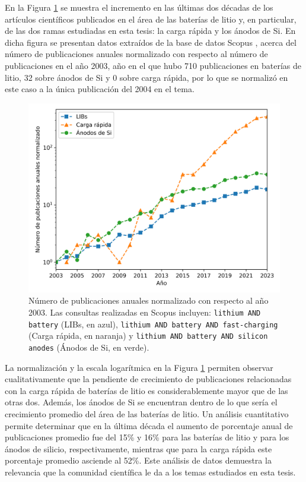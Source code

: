 En la Figura \ref{fig:scopus} se muestra el incremento en las últimas dos décadas
de los artículos científicos publicados en el área de las baterías de litio y, en 
particular, de las dos ramas estudiadas en esta tesis: la carga rápida y los 
ánodos de Si. En dicha figura se presentan datos extraídos de la base de datos 
Scopus \cite{SCOPUS}, acerca del número de publicaciones anuales normalizado con respecto 
al número de publicaciones en el año 2003, año en el que hubo 710 publicaciones 
en baterías de litio, 32 sobre ánodos de Si y 0 sobre carga rápida, por lo que 
se normalizó en este caso a la única publicación del 2004 en el tema.
\begin{figure}[h!]
    \centering
    \includegraphics[width=.8\textwidth]{Introduccion/baterias/scopus.png}
    \caption{Número de publicaciones anuales normalizado con respecto al año 2003. 
    Las consultas realizadas en Scopus \cite{SCOPUS} incluyen: 
    \texttt{lithium AND battery} (LIBs, en azul), \texttt{lithium AND battery AND 
    fast-charging} (Carga rápida, en naranja) y \texttt{lithium AND battery AND 
    silicon anodes} (Ánodos de Si, en verde).}
    \label{fig:scopus}
\end{figure}
La normalización y la escala logarítmica en la Figura \ref{fig:scopus} permiten
observar cualitativamente que la pendiente de crecimiento de publicaciones 
relacionadas con la carga rápida de baterías de litio es considerablemente mayor que 
de las otras dos. Además, los ánodos de Si se encuentran dentro de lo que sería
el crecimiento promedio del área de las baterías de litio. Un análisis 
cuantitativo permite determinar que en la última década el aumento de porcentaje
anual de publicaciones promedio fue del 15\% y 16\% para las baterías de litio 
y para los ánodos de silicio, respectivamente, mientras que para la carga rápida 
este porcentaje promedio asciende al 52\%. Este análisis de datos demuestra la relevancia
que la comunidad científica le da a los temas estudiados en esta tesis.
